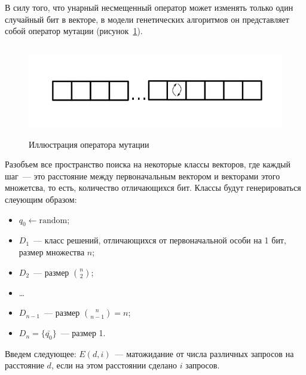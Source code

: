 \label{unary}

В силу того, что унарный несмещенный оператор может изменять только один случайный бит в векторе, в модели генетических алгоритмов он представляет собой оператор мутации (рисунок~\ref{pic:mut-op}). 

\begin{figure}[H]
\centering
\includegraphics[height=4cm]{pic/un.png}
\caption{Иллюстрация оператора мутации}\label{pic:mut-op}
\end{figure}

Разобъем все пространство поиска на некоторые классы векторов, где каждый шаг~--- это расстояние между первоначальным вектором и векторами этого множетсва, то есть, количество отличающихся бит. Классы 
будут генерироваться слеующим образом: 
\begin{itemize}
   \item $q_0 \leftarrow \textrm{random}$;
   \item $D_1$~--- класс решений, отличающихся от первоначальной особи на 1 бит, размер множества $n$;
   \item $D_2$~--- размер $\binom{n}{2}$;
   \item \ldots
   \item $D_{n-1}$~--- размер $\binom{n}{n - 1} = n$;
   \item $D_n = \{\bar{q_0}\}$~--- размер 1.
\end{itemize} 

Введем следующее: $E(d, i)$~--- матожидание от числа различных запросов на расстояние $d$, если на этом расстоянии сделано $i$ запросов.

